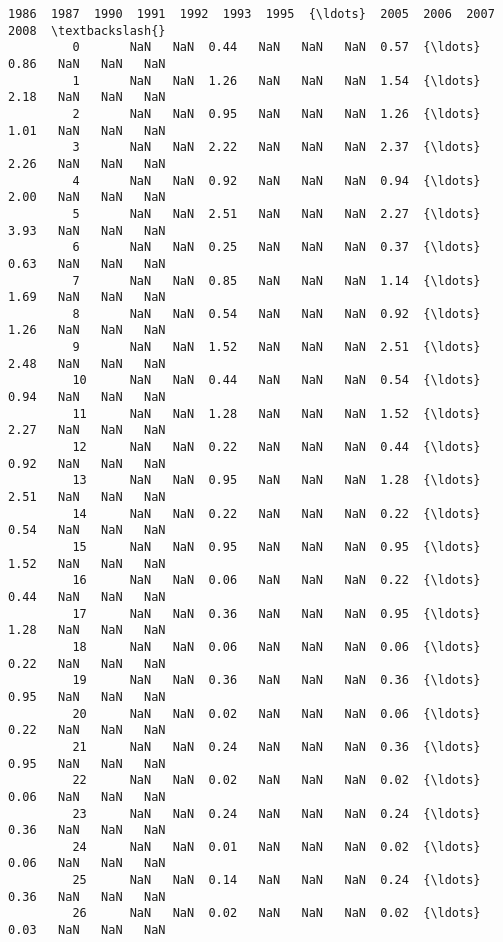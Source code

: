 \documentclass[11pt]{article}
\begin{document}
\begin{Verbatim}[commandchars=\\\{\}]
                1986  1987  1990  1991  1992  1993  1995  {\ldots}  2005  2006  2007  2008  \textbackslash{}
         0       NaN   NaN  0.44   NaN   NaN   NaN  0.57  {\ldots}  0.86   NaN   NaN   NaN   
         1       NaN   NaN  1.26   NaN   NaN   NaN  1.54  {\ldots}  2.18   NaN   NaN   NaN   
         2       NaN   NaN  0.95   NaN   NaN   NaN  1.26  {\ldots}  1.01   NaN   NaN   NaN   
         3       NaN   NaN  2.22   NaN   NaN   NaN  2.37  {\ldots}  2.26   NaN   NaN   NaN   
         4       NaN   NaN  0.92   NaN   NaN   NaN  0.94  {\ldots}  2.00   NaN   NaN   NaN   
         5       NaN   NaN  2.51   NaN   NaN   NaN  2.27  {\ldots}  3.93   NaN   NaN   NaN   
         6       NaN   NaN  0.25   NaN   NaN   NaN  0.37  {\ldots}  0.63   NaN   NaN   NaN   
         7       NaN   NaN  0.85   NaN   NaN   NaN  1.14  {\ldots}  1.69   NaN   NaN   NaN   
         8       NaN   NaN  0.54   NaN   NaN   NaN  0.92  {\ldots}  1.26   NaN   NaN   NaN   
         9       NaN   NaN  1.52   NaN   NaN   NaN  2.51  {\ldots}  2.48   NaN   NaN   NaN   
         10      NaN   NaN  0.44   NaN   NaN   NaN  0.54  {\ldots}  0.94   NaN   NaN   NaN   
         11      NaN   NaN  1.28   NaN   NaN   NaN  1.52  {\ldots}  2.27   NaN   NaN   NaN   
         12      NaN   NaN  0.22   NaN   NaN   NaN  0.44  {\ldots}  0.92   NaN   NaN   NaN   
         13      NaN   NaN  0.95   NaN   NaN   NaN  1.28  {\ldots}  2.51   NaN   NaN   NaN   
         14      NaN   NaN  0.22   NaN   NaN   NaN  0.22  {\ldots}  0.54   NaN   NaN   NaN   
         15      NaN   NaN  0.95   NaN   NaN   NaN  0.95  {\ldots}  1.52   NaN   NaN   NaN   
         16      NaN   NaN  0.06   NaN   NaN   NaN  0.22  {\ldots}  0.44   NaN   NaN   NaN   
         17      NaN   NaN  0.36   NaN   NaN   NaN  0.95  {\ldots}  1.28   NaN   NaN   NaN   
         18      NaN   NaN  0.06   NaN   NaN   NaN  0.06  {\ldots}  0.22   NaN   NaN   NaN   
         19      NaN   NaN  0.36   NaN   NaN   NaN  0.36  {\ldots}  0.95   NaN   NaN   NaN   
         20      NaN   NaN  0.02   NaN   NaN   NaN  0.06  {\ldots}  0.22   NaN   NaN   NaN   
         21      NaN   NaN  0.24   NaN   NaN   NaN  0.36  {\ldots}  0.95   NaN   NaN   NaN   
         22      NaN   NaN  0.02   NaN   NaN   NaN  0.02  {\ldots}  0.06   NaN   NaN   NaN   
         23      NaN   NaN  0.24   NaN   NaN   NaN  0.24  {\ldots}  0.36   NaN   NaN   NaN   
         24      NaN   NaN  0.01   NaN   NaN   NaN  0.02  {\ldots}  0.06   NaN   NaN   NaN   
         25      NaN   NaN  0.14   NaN   NaN   NaN  0.24  {\ldots}  0.36   NaN   NaN   NaN   
         26      NaN   NaN  0.02   NaN   NaN   NaN  0.02  {\ldots}  0.03   NaN   NaN   NaN   

\end{Verbatim}
\end{document}
